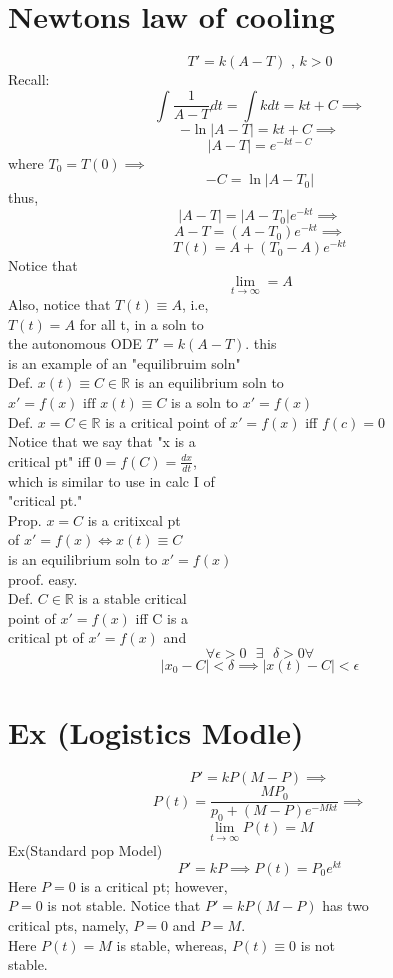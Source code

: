 \section*{ Newtons law of cooling} 
  \[ T' = k(A-T) \text{ , } k>0 \]
  Recall:
  \[ \int \frac{1}{A-T}dt = \int kdt = kt + C \implies \]
  \[ -\ln |A-T| = kt +C \implies  \]
  \[ |A-T| = e^{-kt-C} \]
  where \( T_0 = T(0) \implies  \)
  \[ -C = \ln |A-T_0|  \] thus, 
  \[ |A-T| = |A-T_0|e^{-kt} \implies \]
  \[ A-T = (A-T_0)e^{-kt} \implies \]
  \[ \boxed{T(t) = A + (T_0-A)e^{-kt} } \]
  Notice that 
  \[ \lim_{t \to \infty} = A \]
  Also, notice that \( T(t) \equiv A \),  i.e,\\
  \( T(t) = A \) for all t, in a soln to \\
  the autonomous ODE \( T' = k(A-T) \). this \\
  is  an example of an "equilibruim soln" \\[5mm] 
  Def. \( x(t) \equiv  C \in \mathbb{R} \) is an equilibrium soln to \\
  \( x' = f(x) \text{ iff } x(t) \equiv C \) is a soln to \( x' = f(x) \)
  \\[5mm]
  Def. \( x = C \in \mathbb{R}  \) is a critical point of \( x' = f(x) \)
  iff \( f(c) = 0 \)\\
  Notice that we say that "x is a \\
  critical pt" iff \( 0 = f(C) = \frac{dx}{dt} \), \\
  which is similar to use in calc I of  \\
  "critical pt." \\[5mm]
  Prop. \( x=C \) is a critixcal pt \\
  of \( x'=f(x) \iff x(t) \equiv  C \) \\
  is an equilibrium soln to \( x' = f(x) \) \\
  proof. easy. \\[5mm] 
  Def. \( C \in \mathbb{R} \) is a stable critical \\
  point of \( x' = f(x) \) iff C is a \\
  critical pt of \( x' = f(x)  \) and \\
  \[ \forall \epsilon >0 \text{  } \exists \text{  } \delta >0 \forall \]
  \[ |x_0 -C| < \delta  \implies |x(t) -C| < \epsilon  \]
\section*{Ex (Logistics Modle)}
  \[ P' = kP(M-P) \implies \]
  \[ P(t) = \frac{MP_0}{p_0 + (M - P) e^{-Mkt} } \implies  \]
  \[ \lim_{t \to \infty}P(t) = M \]
  Ex(Standard pop Model) 
  \[ P' = kP \implies P(t) = P_0 e^{kt}  \]
  Here \( P=0 \) is a critical pt; however, \\
  \( P=0  \) is not stable. 
  Notice that \( P' = kP(M-P)  \) has two \\
  critical pts, namely, \( P = 0 \) and \( P =M \). \\
  Here \( P(t) = M \) is stable, whereas, \( P(t) \equiv 0 \) is not \\
  stable.  \\[5mm]  
